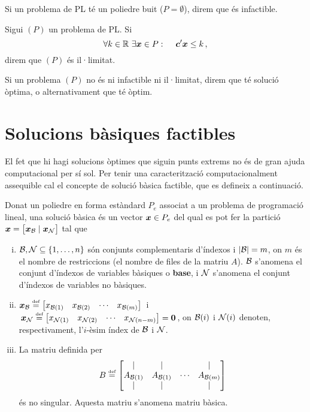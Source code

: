 \begin{defi}
	Si un problema de PL té un poliedre buit ($P=\emptyset$), direm que és 
	infactible.
\end{defi}

\begin{defi}
	Sigui $(P)$ un problema de PL. Si
	\[
		\forall k\in\real \ \exists \vb{x}\in P \qcolon \vb{c}'\vb{x} \le k\,,
	\]
	direm que $(P)$ és il·limitat.
\end{defi}

\begin{defi}
	Si un problema $(P)$ no és ni infactible ni il·limitat, direm que té 
	solució òptima, o alternativament que té òptim.
\end{defi}

\section{Solucions bàsiques factibles}

El fet que hi hagi solucions òptimes que siguin punts extrems no és de gran ajuda computacional per sí sol. Per tenir una caracterització computacionalment assequible cal el concepte de solució bàsica factible, que es defineix a continuació.

\begin{defi}\label{defi:SB}
	Donat un poliedre en forma estàndard $P_e$ associat a un problema de programació lineal, una solució bàsica és un vector $\boldsymbol{x}\in P_e$ del qual es pot fer la partició $\boldsymbol{x} = \left[\boldsymbol{x}_{\mathcal{B}}\mid\boldsymbol{x}_{\mathcal{N}}\right]$ tal que
	\begin{enumerate}[i)]
		\item $\mathcal{B},\mathcal{N}\subseteq\{1,\ldots,n \}$ són conjunts complementaris 
		d'índexos i $|\mathcal{B}| = m$, on $m$ és el nombre de restriccions (el nombre 
		de files de la matriu $A$). $\mathcal{B}$ s'anomena el conjunt d'índexos de 
		variables bàsiques o \textbf{base}, i $\mathcal{N}$ s'anomena el conjunt 
		d'índexos de variables no bàsiques.
		\item $\boldsymbol{x}_{\mathcal{B}} \stackrel{\text{\tiny def}}{=} 
		\begin{bmatrix}x_{\mathcal{B}(1)} & x_{\mathcal{B}(2)} & \cdots & x_{\mathcal{B}(m)}\end{bmatrix}\,$
		i
		$\,\boldsymbol{x}_{\mathcal{N}} \stackrel{\text{\tiny def}}{=} 
		\begin{bmatrix}x_{\mathcal{N}(1)} & x_{\mathcal{N}(2)} & \cdots & 
		x_{\mathcal{N}(n-m)}\end{bmatrix} = \boldsymbol{0}\,$, on $\mathcal{B}(i)$ i $\mathcal{N}(i)$ denoten, 
		respectivament, l'$i$-èsim índex de $\mathcal{B}$ i $\mathcal{N}$.
		\item La matriu definida per
		\[
			B \stackrel{\text{\tiny def}}{=}
			\begin{bmatrix}
			\arrowvert& 	\arrowvert& 	  & 	\arrowvert\\
			A_{\mathcal{B}(1)}&		A_{\mathcal{B}(1)}&	\cdots&		A_{\mathcal{B}(m)}\\
			\arrowvert& 	\arrowvert& 	  & 	\arrowvert\\
			\end{bmatrix}
		\]
		és no singular. Aquesta matriu s'anomena matriu bàsica.
	\end{enumerate}
\end{defi}

